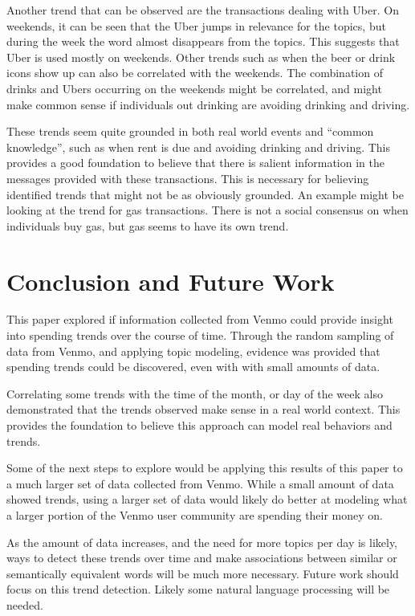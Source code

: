 \documentclass[conference]{IEEEtran}
\begin{document}
Another trend that can be observed are the transactions dealing with Uber. On weekends, it can be seen that the Uber jumps in relevance for the topics, but during the week the word almost disappears from the topics. This suggests that Uber is used mostly on weekends. Other trends such as when the beer or drink icons show up can also be correlated with the weekends. The combination of drinks and Ubers occurring on the weekends might be correlated, and might make common sense if individuals out drinking are avoiding drinking and driving. 

These trends seem quite grounded in both real world events and ``common knowledge'', such as when rent is due and avoiding drinking and driving. This provides a good foundation to believe that there is salient information in the messages provided with these transactions. This is necessary for believing identified trends that might not be as obviously grounded. An example might be looking at the trend for gas transactions. There is not a social consensus on when individuals buy gas, but gas seems to have its own trend.

\section{Conclusion and Future Work}
This paper explored if information collected from Venmo could provide insight into spending trends over the course of time. Through the random sampling of data from Venmo, and applying topic modeling, evidence was provided that spending trends could be discovered, even with with small amounts of data. 

Correlating some trends with the time of the month, or day of the week also demonstrated that the trends observed make sense in a real world context. This provides the foundation to believe this approach can model real behaviors and trends. 

Some of the next steps to explore would be applying this results of this paper to a much larger set of data collected from Venmo. While a small amount of data showed trends, using a larger set of data would likely do better at modeling what a larger portion of the Venmo user community are spending their money on. 

As the amount of data increases, and the need for more topics per day is likely, ways to detect these trends over time and make associations between similar or semantically equivalent words will be much more necessary. Future work should focus on this trend detection. Likely some natural language processing will be needed. 
\end{document}
